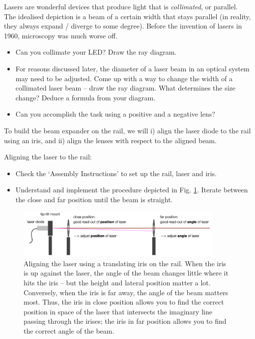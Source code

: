 \documentclass[a4paper]{report}
\begin{document}
	Lasers are wonderful devices that produce light that is \emph{collimated}, or parallel. The idealised depiction is a beam of a certain width that stays parallel (in reality, they always expand / diverge to some degree). Before the invention of lasers in 1960, microscopy was much worse off.
	
    \begin{itemize}
        \item Can you collimate your LED? Draw the ray diagram.
		\item For reasons discussed later, the diameter of a laser beam in an optical system may need to be adjusted. Come up with a way to change the width of a collimated laser beam -- draw the ray diagram. What determines the size change? Deduce a formula from your diagram. 
	    \item Can you accomplish the task using a positive and a negative lens? 
	\end{itemize}

    \noindent
	To build the beam expander on the rail, we will i) align the laser diode to the rail using an iris, and ii) align the lenses with respect to the aligned beam. 


    \noindent
	Aligning the laser to the rail:
	\begin{itemize}
	    \item Check the `Assembly Instructions' to set up the rail, laser and iris.
	    \item Understand and implement the procedure depicted in Fig. \ref{fig:laser_alignment}. Iterate between the close and far position until the beam is straight.
	\end{itemize}


	\begin{figure}[h]
		\center
		\includegraphics[width=0.9\textwidth]{figures/laser_alignment.png}
		\captionsetup{width=0.9\textwidth}
		\caption{Aligning the laser using a translating iris on the rail. When the iris is up against the laser, the angle of the beam changes little where it hits the iris -- but the height and lateral position matter a lot. Conversely, when the iris is far away, the angle of the beam matters most. Thus, the iris in close position allows you to find the correct position in space of the laser that intersects the imaginary line passing through the irises; the iris in far position allows you to find the correct angle of the beam.}
		\label{fig:laser_alignment}
	\end{figure}
	
\end{document}
